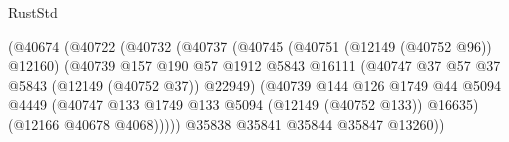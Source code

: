 \begin{lexlean}{RustStd}
\begin{coremodule}
                                              (@40674
                                                (@40722
                                                  (@40732
                                                    (@40737
                                                      (@40745
                                                        (@40751 (@12149 (@40752 @96)) @12160)
                                                        (@40739
                                                          @157
                                                          @190
                                                          @57
                                                          @1912
                                                          @5843
                                                          @16111
                                                          (@40747
                                                            @37
                                                            @57
                                                            @37
                                                            @5843
                                                            (@12149 (@40752 @37))
                                                            @22949)
                                                          (@40739
                                                            @144
                                                            @126
                                                            @1749
                                                            @44
                                                            @5094
                                                            @4449
                                                            (@40747
                                                              @133
                                                              @1749
                                                              @133
                                                              @5094
                                                              (@12149 (@40752 @133))
                                                              @16635)
                                                            (@12166 @40678 @4068)))))
                                                    @35838
                                                    @35841
                                                    @35844
                                                    @35847
                                                    @13260))

\end{coremodule}
\end{lexlean}
